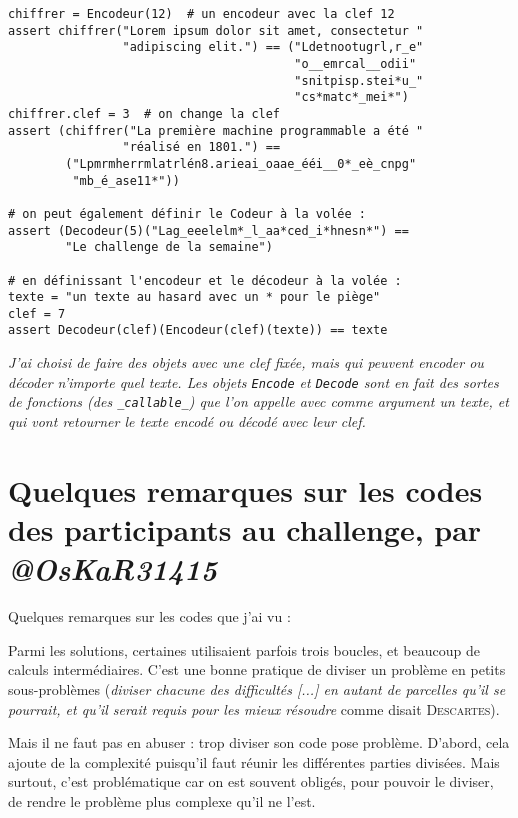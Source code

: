 \begin{lstlisting}
chiffrer = Encodeur(12)  # un encodeur avec la clef 12
assert chiffrer("Lorem ipsum dolor sit amet, consectetur "
                "adipiscing elit.") == ("Ldetnootugrl,r_e"
                                        "o__emrcal__odii"
                                        "snitpisp.stei*u_"
                                        "cs*matc*_mei*")
chiffrer.clef = 3  # on change la clef
assert (chiffrer("La première machine programmable a été "
                "réalisé en 1801.") ==
        ("Lpmrmherrmlatrlén8.arieai_oaae_ééi__0*_eè_cnpg"
         "mb_é_ase11*"))

# on peut également définir le Codeur à la volée :
assert (Decodeur(5)("Lag_eeelelm*_l_aa*ced_i*hnesn*") ==
        "Le challenge de la semaine")

# en définissant l'encodeur et le décodeur à la volée :
texte = "un texte au hasard avec un * pour le piège"
clef = 7
assert Decodeur(clef)(Encodeur(clef)(texte)) == texte
\end{lstlisting}
\medskip

\textit{J'ai choisi de faire des objets avec une clef fixée, mais qui peuvent encoder ou décoder n'importe quel texte. Les objets \texttt{Encode} et \texttt{Decode} sont en fait des sortes de fonctions (des \texttt{\_callable\_}) que l'on appelle avec comme argument un texte, et qui vont retourner le texte encodé ou décodé avec leur clef.}\fg{}
\medskip

\section[Quelques remarques sur les codes des participants]{Quelques remarques sur les codes des \newline participants au challenge, par \newline \textbf{\textit{@OsKaR31415}}}
Quelques remarques sur les codes que j'ai vu :
\medskip

Parmi les solutions, certaines utilisaient parfois trois boucles, et beaucoup de calculs intermédiaires. C'est une bonne pratique de diviser un problème en petits sous-problèmes (\og \textit{diviser chacune des difficultés [...] en autant de parcelles qu'il se pourrait, et qu'il serait requis pour les mieux résoudre}\fg{} comme disait \textsc{Descartes}).
\medskip

Mais il ne faut pas en abuser : trop diviser son code pose problème. D'abord, cela ajoute de la complexité puisqu'il faut réunir les différentes parties divisées. Mais surtout, c'est problématique car on est souvent obligés, pour pouvoir le diviser, de rendre le problème plus complexe qu'il ne l'est.
\medskip

